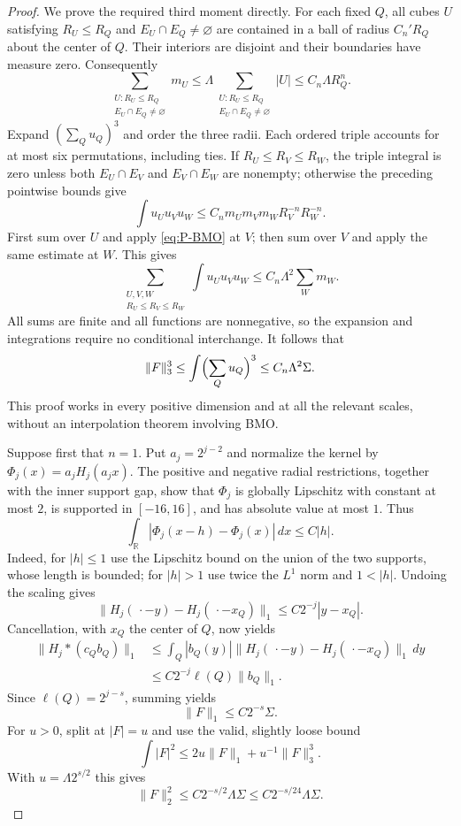\documentclass[11pt]{article}
\numberwithin{equation}{section}
\theoremstyle{remark}
\theoremstyle{definition}
\newcommand{\R}{\mathbb R}
\newcommand{\norm}[1]{\lVert #1\rVert}
\begin{document}
\begin{proof}
We prove the required third moment directly. For each fixed $Q$, all
cubes $U$ satisfying $R_U\le R_Q$ and $E_U\cap E_Q\ne\varnothing$
are contained in a ball of radius $C_n'R_Q$ about the center of $Q$.
Their interiors are disjoint and their boundaries have measure zero.
Consequently
\begin{equation}\label{eq:P-BMO}
 \sum_{\substack{U:R_U\le R_Q\\E_U\cap E_Q\ne\varnothing}}m_U
 \le\Lambda\sum_{\substack{U:R_U\le R_Q\\E_U\cap E_Q\ne\varnothing}}|U|
 \le C_n\Lambda R_Q^n.
\end{equation}
Expand $(\sum_Q u_Q)^3$ and order the three radii. Each ordered
triple accounts for at most six permutations, including ties.
If $R_U\le R_V\le R_W$, the triple integral is zero unless both
$E_U\cap E_V$ and $E_V\cap E_W$ are nonempty; otherwise the preceding
pointwise bounds give
\[
 \int u_Uu_Vu_W\le C_n m_Um_Vm_W R_V^{-n}R_W^{-n}.
\]
First sum over $U$ and apply \eqref{eq:P-BMO} at $V$; then sum over
$V$ and apply the same estimate at $W$. This gives
\begin{equation}\label{eq:L1BMO}
 \sum_{\substack{U,V,W\\R_U\le R_V\le R_W}}
       \int u_Uu_Vu_W
 \le C_n\Lambda^2\sum_W m_W.
\end{equation}
All sums are finite and all functions are nonnegative, so the
expansion and integrations require no conditional interchange.
It follows that
\begin{equation}\label{eq:full-L3}
 \norm F_3^3\le\int\Bigl(\sum_Q u_Q\Bigr)^3
 \le C_n\Lambda^2\Sigma.
\end{equation}
This proof works in every positive dimension and at all the relevant
scales, without an interpolation theorem involving BMO.

Suppose first that $n=1$. Put $a_j=2^{j-2}$ and normalize the
kernel by $\Phi_j(x)=a_jH_j(a_jx)$. The positive and negative radial
restrictions, together with the inner support gap, show that $\Phi_j$
is globally Lipschitz with constant at most $2$, is supported in
$[-16,16]$, and has absolute value at most $1$. Thus
\[
 \int_{\mathbb R}|\Phi_j(x-h)-\Phi_j(x)|\,dx\le C|h|.
\]
Indeed, for $|h|\le1$ use the Lipschitz bound on the union of the two
supports, whose length is bounded; for $|h|>1$ use twice the $L^1$
norm and $1<|h|$. Undoing the scaling gives
\[
 \norm{H_j(\,\cdot-y)-H_j(\,\cdot-x_Q)}_1
 \le C2^{-j}|y-x_Q|.
\]
Cancellation, with $x_Q$ the center of $Q$, now yields
\begin{align*}
 \norm{H_j*(c_Qb_Q)}_1
 &\le\int_Q |b_Q(y)|
       \norm{H_j(\,\cdot-y)-H_j(\,\cdot-x_Q)}_1\,dy\\
 &\le C2^{-j}\ell(Q)\norm{b_Q}_1.
\end{align*}
Since $\ell(Q)=2^{j-s}$, summing yields
\begin{equation}\label{eq:fullkernel-one-L1}
 \norm F_1\le C2^{-s}\Sigma.
\end{equation}
For $u>0$, split at $|F|=u$ and use the valid, slightly loose bound
\[
 \int|F|^2\le2u\norm F_1+u^{-1}\norm F_3^3.
\]
With $u=\Lambda2^{s/2}$ this gives
\[
 \norm F_2^2\le C2^{-s/2}\Lambda\Sigma
 \le C2^{-s/24}\Lambda\Sigma.
\]


\end{proof}
\end{document}

